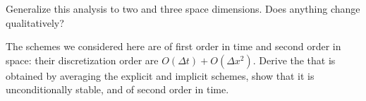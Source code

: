 \begin{exercise}
  Generalize this analysis to two and three space dimensions.
  Does anything change qualitatively?
\end{exercise}

\begin{exercise}
  \label{ex:crank}
  The schemes we considered here are of first order in time and second
  order in space: their discretization order are $O(\Delta t)+O(\Delta
  x^2)$. Derive the  that is obtained
  by averaging the explicit and implicit schemes, show that it is
  unconditionally stable, and of second order in time.
\end{exercise}


